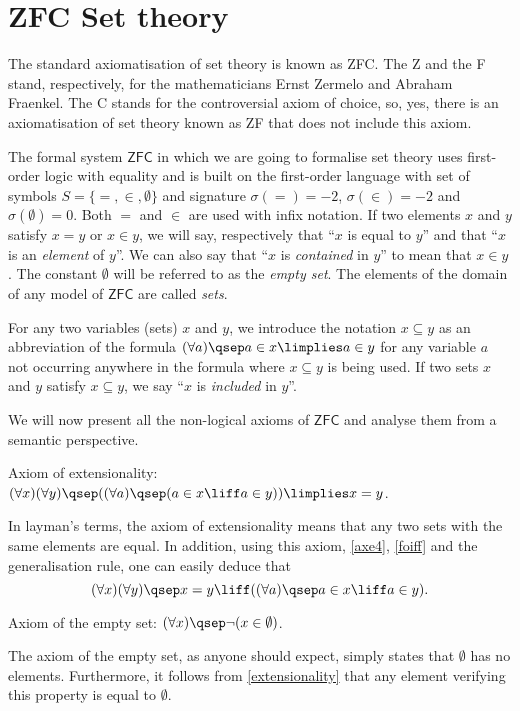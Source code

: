 
\section{ZFC Set theory}

\begin{para}
The standard axiomatisation of set theory is known as ZFC. The Z and the F stand, respectively, for the mathematicians Ernst Zermelo and Abraham Fraenkel. The C stands for the controversial axiom of choice, so, yes, there is an axiomatisation of set theory known as ZF that does not include this axiom.

The formal system $\mathsf{ZFC}$ in which we are going to formalise set theory uses first-order logic with equality and is built on the first-order language with set of symbols $S = \{=,\in,\emptyset\}$ and signature $\sigma(=) = -2$,  $\sigma(\in) = -2$ and $\sigma(\emptyset) = 0$. Both $=$ and $\in$ are used with infix notation.
If two elements $x$ and $y$ satisfy $x = y$ or $x\in y$, we will say, respectively that ``$x$ is equal to $y$'' and that ``$x$ is an \emph{element} of $y$''.
We can also say that ``$x$ is \emph{contained} in $y$'' to mean that $x\in y$.
The constant $\emptyset$ will be referred to as the \emph{empty set}.
The elements of the domain of any model of $\mathsf{ZFC}$ are called \emph{sets}.

For any two variables (sets) $x$ and $y$, we introduce the notation $x\subseteq y$ as an abbreviation of the formula $(\forall a)\qsep a\in x \limplies a \in y$ for any variable $a$ not occurring anywhere in the formula where $x\subseteq y$ is being used.
If two sets $x$ and $y$ satisfy $x\subseteq y$, we say ``$x$ is \emph{included} in $y$''.

We will now present all the non-logical axioms of $\mathsf{ZFC}$ and analyse them from a semantic perspective.
\begin{axioms}[ZF]
\item \label{extensionality} Axiom of extensionality: $(\forall x)(\forall y)\qsep ((\forall a)\qsep (a \in x \liff a\in y)) \limplies x = y$.
\end{axioms}
In layman's terms, the axiom of extensionality means that any two sets with the same elements are equal.
In addition, using this axiom, \ref{axe4}, \ref{foiff} and the generalisation rule, one can easily deduce that
\[(\forall x)(\forall y)\qsep x = y \liff ((\forall a)\qsep a\in x \liff a \in y).\]

\begin{axioms}
\item \label{emptyset} Axiom of the empty set: $(\forall x)\qsep \lnot(x\in\emptyset)$.
\end{axioms}
The axiom of the empty set, as anyone should expect, simply states that $\emptyset$ has no elements. Furthermore, it follows from \ref{extensionality} that any element verifying this property is equal to $\emptyset$.


\end{para}
